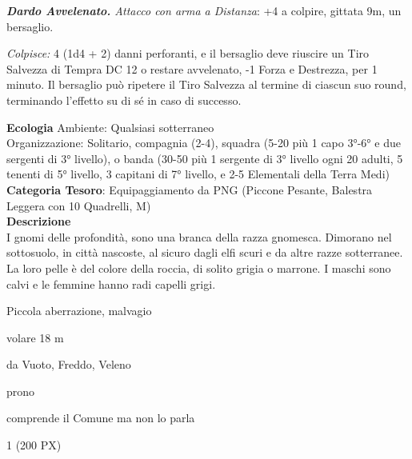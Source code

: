 \begin{multicols}{2}
{\emph{\textbf{Dardo Avvelenato.} Attacco con arma a Distanza}: +4 a colpire, gittata 9m, un bersaglio.

\emph{Colpisce:} 4 (1d4 + 2) danni perforanti, e il bersaglio deve riuscire un Tiro Salvezza di Tempra DC 12 o restare avvelenato, -1 Forza e Destrezza, per 1 minuto. Il bersaglio può ripetere il Tiro Salvezza al termine di ciascun suo round, terminando l'effetto su di sé in caso di successo.

\textbf{Ecologia}
Ambiente: Qualsiasi sotterraneo\\
Organizzazione: Solitario, compagnia (2-4), squadra (5-20 più 1 capo 3°-6° e due sergenti di 3° livello), o banda (30-50 più 1 sergente di 3° livello ogni 20 adulti, 5 tenenti di 5° livello, 3 capitani di 7° livello, e 2-5 Elementali della Terra Medi)\\
\textbf{Categoria Tesoro}: Equipaggiamento da PNG (Piccone Pesante, Balestra Leggera con 10 Quadrelli, M)\\
\textbf{Descrizione}\\
I gnomi delle profondità, sono una branca della razza gnomesca. Dimorano nel sottosuolo, in città nascoste, al sicuro dagli elfi scuri e da altre razze sotterranee. La loro pelle è del colore della roccia, di solito grigia o marrone. I maschi sono calvi e le femmine hanno radi capelli grigi.

\begin{description}[noitemsep, topsep=0pt, parsep=0pt, partopsep=0pt, itemsep=1pt, leftmargin=2.35cm,  labelwidth=2.2cm, itemindent=0cm, listparindent=0pt] %
\setlength{\baselineskip}{10pt}
\item[\textbf{Taglia/Tipo}] Piccola aberrazione, malvagio
\item[\textbf{Caratt.}] 
\item[\textbf{Punti Ferita}] 
\item[\textbf{Movimento}] volare 18 m
\item[\textbf{Tiri Salvez.}] 
\item[\textbf{Imm. Danni}] da Vuoto, Freddo, Veleno\\
\item[\textbf{Immunità}] prono
\item[\textbf{Sensi}] 
\item[\textbf{Linguaggi}] comprende il Comune ma non lo parla
\item[\textbf{Sfida}] 1 (200 PX)
\end{description}
\smallskip

}
\end{multicols}
